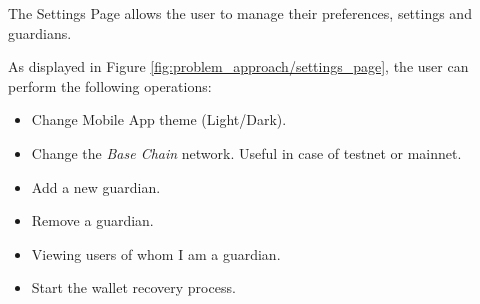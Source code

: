 The Settings Page allows the user to manage their preferences, settings and guardians. 

As displayed in Figure \ref{fig:problem_approach/settings_page}, the user can perform the following operations:
\begin{itemize}
    \item Change Mobile App theme (Light/Dark).
    \item Change the \textit{Base Chain} network. Useful in case of testnet or mainnet.
    \item Add a new guardian.
    \item Remove a guardian.
    \item Viewing users of whom I am a guardian.
    \item Start the wallet recovery process.
\end{itemize}

